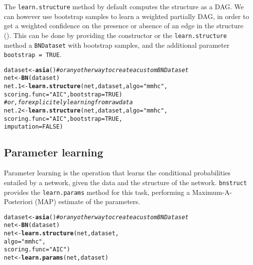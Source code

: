 \documentclass{article}\usepackage[]{graphicx}\usepackage[]{color}
\makeatletter
\newcommand{\hlnum}[1]{\textcolor[rgb]{0.686,0.059,0.569}{#1}}%
\newcommand{\hlstr}[1]{\textcolor[rgb]{0.192,0.494,0.8}{#1}}%
\newcommand{\hlcom}[1]{\textcolor[rgb]{0.678,0.584,0.686}{\textit{#1}}}%
\newcommand{\hlstd}[1]{\textcolor[rgb]{0.345,0.345,0.345}{#1}}%
\newcommand{\hlkwb}[1]{\textcolor[rgb]{0.69,0.353,0.396}{#1}}%
\newcommand{\hlkwc}[1]{\textcolor[rgb]{0.333,0.667,0.333}{#1}}%
\newcommand{\hlkwd}[1]{\textcolor[rgb]{0.737,0.353,0.396}{\textbf{#1}}}%
\newenvironment{kframe}{%
 \def\at@end@of@kframe{}%
 \ifinner\ifhmode%
  \def\at@end@of@kframe{\end{minipage}}%
  \begin{minipage}{\columnwidth}%
 \fi\fi%
 \def\FrameCommand##1{\hskip\@totalleftmargin \hskip-\fboxsep
 \colorbox{shadecolor}{##1}\hskip-\fboxsep
     \hskip-\linewidth \hskip-\@totalleftmargin \hskip\columnwidth}%
 \MakeFramed {\advance\hsize-\width
   \@totalleftmargin\z@ \linewidth\hsize
   \@setminipage}}%
 {\par\unskip\endMakeFramed%
 \at@end@of@kframe}
\newenvironment{knitrout}{}{} %
\newcommand{\Robject}[1]{{\texttt{#1}}}
\newcommand{\Rpackage}[1]{{\texttt{#1}}}
\newcommand{\Rmethod}[1]{{\texttt{#1}}}
\newcommand{\Rfunarg}[1]{{\texttt{#1}}}
\makeatother
\begin{document}
The \Rmethod{learn.structure} method by default computes the structure as a DAG. We can however use
bootstrap samples to learn a weighted partially DAG, in order to get a weighted confidence on the presence or
absence of an edge in the structure (\citet*{friedman1999data}). This can be done by providing the constructor or the \Rmethod{learn.structure}
method a \Robject{BNDataset} with bootstrap samples, and the additional parameter \Rfunarg{bootstrap = TRUE}.
\begin{knitrout}
\color{fgcolor}\begin{kframe}
\begin{alltt}
\hlstd{dataset} \hlkwb{<-} \hlkwd{asia}\hlstd{()} \hlcom{# or any other way to create a custom BNDataset}
\hlstd{net}     \hlkwb{<-} \hlkwd{BN}\hlstd{(dataset)}
\hlstd{net.1}   \hlkwb{<-} \hlkwd{learn.structure}\hlstd{(net, dataset,} \hlkwc{algo} \hlstd{=} \hlstr{"mmhc"}\hlstd{,}
              \hlkwc{scoring.func} \hlstd{=} \hlstr{"AIC"}\hlstd{,} \hlkwc{bootstrap} \hlstd{=} \hlnum{TRUE}\hlstd{)}
\hlcom{# or, for explicitely learning from raw data}
\hlstd{net.2}   \hlkwb{<-} \hlkwd{learn.structure}\hlstd{(net, dataset,} \hlkwc{algo} \hlstd{=} \hlstr{"mmhc"}\hlstd{,}
              \hlkwc{scoring.func} \hlstd{=} \hlstr{"AIC"}\hlstd{,} \hlkwc{bootstrap} \hlstd{=} \hlnum{TRUE}\hlstd{,}
              \hlkwc{imputation} \hlstd{=} \hlnum{FALSE}\hlstd{)}
\end{alltt}
\end{kframe}
\end{knitrout}

\subsection{Parameter learning}
Parameter learning is the operation that learns the conditional probabilities entailed by a network,
given the data and the structure of the network. \Rpackage{bnstruct} provides the \Rmethod{learn.params} method for this task,
performing a Maximum-A-Posteriori (MAP) estimate of the parameters.
\begin{knitrout}
\color{fgcolor}\begin{kframe}
\begin{alltt}
\hlstd{dataset} \hlkwb{<-} \hlkwd{asia}\hlstd{()} \hlcom{# or any other way to create a custom BNDataset}
\hlstd{net}     \hlkwb{<-} \hlkwd{BN}\hlstd{(dataset)}
\hlstd{net}     \hlkwb{<-} \hlkwd{learn.structure}\hlstd{(net, dataset,}
                           \hlkwc{algo} \hlstd{=} \hlstr{"mmhc"}\hlstd{,}
                           \hlkwc{scoring.func} \hlstd{=} \hlstr{"AIC"}\hlstd{)}
\hlstd{net}     \hlkwb{<-} \hlkwd{learn.params}\hlstd{(net, dataset)}
\end{alltt}
\end{kframe}
\end{knitrout}
\end{document}
